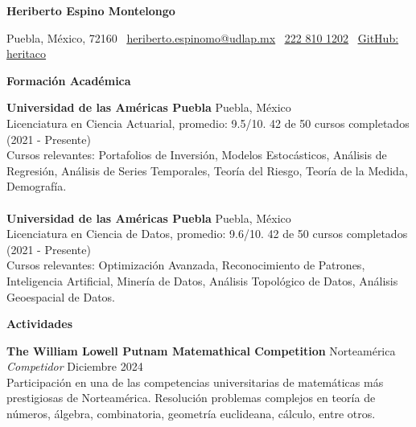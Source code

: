 \documentclass[8pt]{extarticle} %
\begin{document}
{\fontsize{10pt}{12pt}\selectfont  
\begin{center}  
    \textbf{Heriberto Espino Montelongo}\\  
    \vspace{-1ex} %
\end{center}  
}

\begin{center}  
    Puebla, México, 72160 \textbullet \   
    \href{mailto:heriberto.espinomo@udlap.mx}{\textcolor{customblue}{\underline{heriberto.espinomo@udlap.mx}}} \textbullet \   
    \href{tel:+522228101202}{\textcolor{customblue}{\underline{222 810 1202}}} \textbullet \   
    \href{https://github.com/heritaco}{\textcolor{customblue}{\underline{GitHub: heritaco}}}  
\end{center}

\begin{center}  
    \vspace{5ex}  
    \textbf{Formación Académica}  
    \vspace{-2ex}  
\end{center}

\textbf{Universidad de las Américas Puebla} \hfill Puebla, México\\  
Licenciatura en Ciencia Actuarial, promedio: 9.5/10. \hfill 42 de 50 cursos completados (2021 - Presente) \\  
Cursos relevantes: Portafolios de Inversión, Modelos Estocásticos, Análisis de Regresión, Análisis de Series Temporales, Teoría del Riesgo, Teoría de la Medida, Demografía.\\  
\\  
\textbf{Universidad de las Américas Puebla} \hfill Puebla, México\\  
Licenciatura en Ciencia de Datos, promedio: 9.6/10. \hfill 42 de 50 cursos completados (2021 - Presente)\\  
Cursos relevantes: Optimización Avanzada, Reconocimiento de Patrones, Inteligencia Artificial, Minería de Datos, Análisis Topológico de Datos, Análisis Geoespacial de Datos.

\begin{center}  
    \vspace{1ex}  
    \textbf{Actividades}  
    \vspace{-1ex}  
\end{center}

\textbf{The William Lowell Putnam Matemathical Competition} \hfill Norteamérica\\  
\textit{Competidor} \hfill Diciembre 2024\\  
Participación en una de las competencias universitarias de matemáticas más prestigiosas de Norteamérica. Resolución problemas complejos en teoría de números, álgebra, combinatoria, geometría euclideana, cálculo, entre otros.\\
\end{document}
